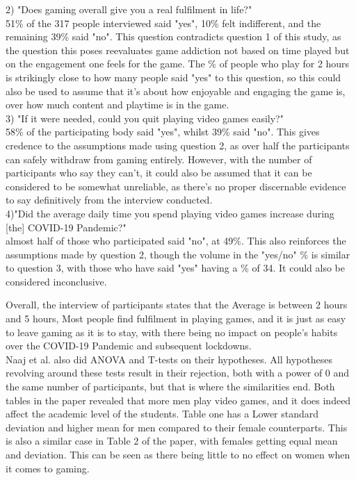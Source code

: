 \documentclass[conference]{IEEEtran}
\begin{document}
2) "Does gaming overall give you a real fulfilment in life?"\\
51\% of the 317 people interviewed said "yes", 10\% felt indifferent, and the remaining 39\% said "no".  This question contradicts question 1 of this study, as the question this poses reevaluates game addiction not based on time played but on the engagement one feels for the game. The \% of people who play for 2 hours is strikingly close to how many people said "yes" to this question, so this could also be used to assume that it's about how enjoyable and engaging the game is, over how much content and playtime is in the game.\\

3) "If it were needed, could you quit playing video games easily?"\\
58\% of the participating body said "yes", whilst 39\% said "no". This gives credence to the assumptions made using question 2, as over half the participants can safely withdraw from gaming entirely. However, with the number of participants who say they can't, it could also be assumed that it can be considered to be somewhat unreliable, as there's no proper discernable evidence to say definitively from the interview conducted.\\ 
 
4)"Did the average daily time you spend playing video games increase during [the] COVID-19 Pandemic?"\\
almost half of those who participated said "no", at 49\%. This also reinforces the assumptions made by question 2, though the volume in the "yes/no" \% is similar to question 3, with those who have said "yes" having a \% of 34. It could also be considered inconclusive.

Overall, the interview of participants states that the Average is between 2 hours and 5 hours, Most people find fulfilment in playing games, and it is just as easy to leave gaming as it is to stay, with there being no impact on people's habits over the COVID-19 Pandemic and subsequent lockdowns.\\

Naaj et al. also did ANOVA and T-tests on their hypotheses. All hypotheses revolving around these tests result in their rejection, both with a power of 0 and the same number of participants, but that is where the similarities end. Both tables in the paper revealed that more men play video games, and it does indeed affect the academic level of the students. Table one has a Lower standard deviation and higher mean for men compared to their female counterparts. This is also a similar case in Table 2 of the paper, with females getting equal mean and deviation. This can be seen as there being little to no effect on women when it comes to gaming.\\
\end{document}
